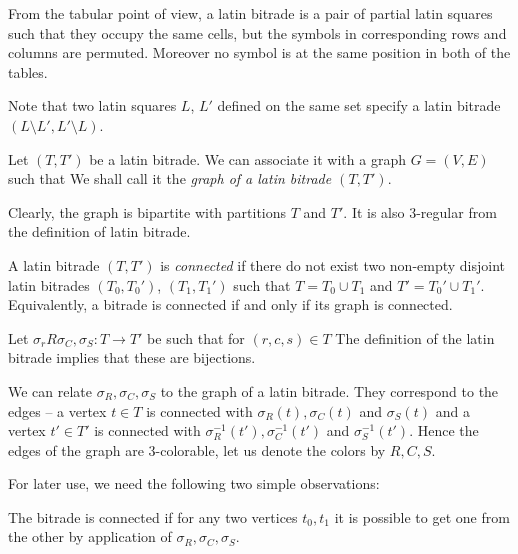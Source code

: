 From the tabular point of view, a latin bitrade is a pair of partial latin squares such that they occupy the same cells, but the symbols in corresponding rows and columns are permuted. Moreover no symbol is at the same position in both of the tables.


Note that two latin squares $L$, $L'$ defined on the same set specify a latin bitrade $(L \setminus L', L' \setminus L)$.

\begin{defn}
Let $(T, T')$ be a latin bitrade. We can associate it with a graph $G = (V, E)$ such that
We shall call it the \emph{graph of a latin bitrade $(T, T')$}.
\end{defn}

Clearly, the graph is bipartite with partitions $T$ and $T'$. It is also 3-regular from the definition of latin bitrade.

A latin bitrade $(T,T')$ is \emph{connected} if there do not exist two non-empty disjoint latin bitrades $(T_0,T_0')$, $(T_1,T_1')$ such that $T = T_0 \cup T_1$ and $T' = T_0' \cup T_1'$. Equivalently, a bitrade is connected if and only if its graph is connected.

Let $\sigma_rR \sigma_C, \sigma_S : T \rightarrow T'$ be such that for $(r,c,s) \in T$
The definition of the latin bitrade implies that these are bijections.

We can relate $\sigma_R, \sigma_C, \sigma_S$ to the graph of a latin bitrade. They correspond to the edges -- a vertex $t \in T$ is connected with $\sigma_R(t), \sigma_C(t)$ and $\sigma_S(t)$ and a vertex $t' \in T'$ is connected with $\sigma_R^{-1}(t'), \sigma_C^{-1}(t')$ and $\sigma_S^{-1}(t')$. Hence the edges of the graph are 3-colorable, let us denote the colors by $R,C,S$.


For later use, we need the following two simple observations:

\begin{lem}
The bitrade is connected if for any two vertices $t_0,t_1$ it is possible to get one from the other by application of $\sigma_R, \sigma_C, \sigma_S$.
\end{lem}

